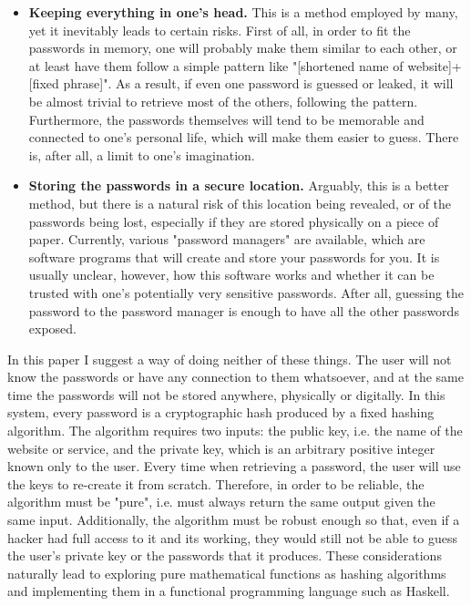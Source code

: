 \documentclass[12pt, a4paper]{article}
\begin{document}
\begin{itemize}
    \item \textbf{Keeping everything in one's head.} This is a method employed by many, yet it inevitably leads to certain risks. First of all, in order to fit the passwords in memory, one will probably make them similar to each other, or at least have them follow a simple pattern like "[shortened name of website]+[fixed phrase]". As a result, if even one password is guessed or leaked, it will be almost trivial to retrieve most of the others, following the pattern. Furthermore, the passwords themselves will tend to be memorable and connected to one's personal life, which will make them easier to guess. There is, after all, a limit to one's imagination.
    \item \textbf{Storing the passwords in a secure location.} Arguably, this is a better method, but there is a natural risk of this location being revealed, or of the passwords being lost, especially if they are stored physically on a piece of paper. Currently, various "password managers" are available, which are software programs that will create and store your passwords for you. It is usually unclear, however, how this software works and whether it can be trusted with one's potentially very sensitive passwords. After all, guessing the password to the password manager is enough to have all the other passwords exposed.
\end{itemize}

In this paper I suggest a way of doing neither of these things. The user will not know the passwords or have any connection to them whatsoever, and at the same time the passwords will not be stored anywhere, physically or digitally. In this system, every password is a cryptographic hash produced by a fixed hashing algorithm. The algorithm requires two inputs: the public key, i.e. the name of the website or service, and the private key, which is an arbitrary positive integer known only to the user. Every time when retrieving a password, the user will use the keys to re-create it from scratch. Therefore, in order to be reliable, the algorithm must be "pure", i.e. must always return the same output given the same input. Additionally, the algorithm must be robust enough so that, even if a hacker had full access to it and its working, they would still not be able to guess the user's private key or the passwords that it produces. These considerations naturally lead to exploring pure mathematical functions as hashing algorithms and implementing them in a functional programming language such as Haskell.
\end{document}

